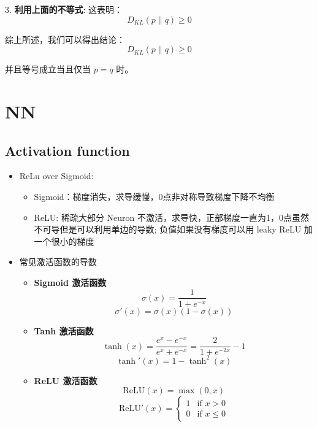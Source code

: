 \documentclass[12pt]{article}
\numberwithin{theorem}{section} %
\numberwithin{definition}{section} %
\numberwithin{assumption}{section} %
\numberwithin{lemma}{section} %
\numberwithin{remark}{section} %
\numberwithin{prop}{section} %
\numberwithin{corollary}{section} %
\numberwithin{example}{section} %
\numberwithin{question}{section} %
\numberwithin{problem}{section} %
\numberwithin{conjecture}{section} %
\numberwithin{append}{section} %
\numberwithin{property}{section} %
\begin{document}
\begin{CJK}{UTF8}{gbsn}
	3. \textbf{利用上面的不等式}:
	这表明：
	\begin{equation}
		D_{KL}(p \parallel q) \geq 0
	\end{equation}
	
	综上所述，我们可以得出结论：
	\begin{equation}
		D_{KL}(p \parallel q) \geq 0
	\end{equation} 
	
	并且等号成立当且仅当 \( p = q \) 时。
	



\section{NN}
\subsection{Activation function}
\begin{itemize}
	\item ReLu over Sigmoid:
	\begin{itemize}
		\item Sigmoid：梯度消失，求导缓慢，0点非对称导致梯度下降不均衡
		\item ReLU: 稀疏大部分 Neuron 不激活，求导快，正部梯度一直为1，0点虽然不可导但是可以利用单边的导数; 负值如果没有梯度可以用 leaky ReLU 加一个很小的梯度
	\end{itemize}
	\item 常见激活函数的导数
	\begin{itemize}
		\item \textbf{Sigmoid 激活函数}
		\begin{equation}
			\sigma(x) = \frac{1}{1 + e^{-x}}
		\end{equation}
		\begin{equation}
			\sigma'(x) = \sigma(x)(1 - \sigma(x))
		\end{equation}
		
		\item \textbf{Tanh 激活函数}
		\begin{equation}
			\tanh(x) = \frac{e^{x} - e^{-x}}{e^{x} + e^{-x}} = \frac{2}{1 + e^{-2x}} - 1
		\end{equation}
		\begin{equation}
			\tanh'(x) = 1 - \tanh^2(x)
		\end{equation}
		
		\item \textbf{ReLU 激活函数}
		\begin{equation}
			\text{ReLU}(x) = \max(0, x)
		\end{equation}
		\begin{equation}
			\text{ReLU}'(x) = 
			\begin{cases} 
				1 & \text{if } x > 0 \\ 
				0 & \text{if } x \leq 0 
			\end{cases}
		\end{equation}
		

\end{itemize}
\end{itemize}
\end{CJK}
\end{document}

